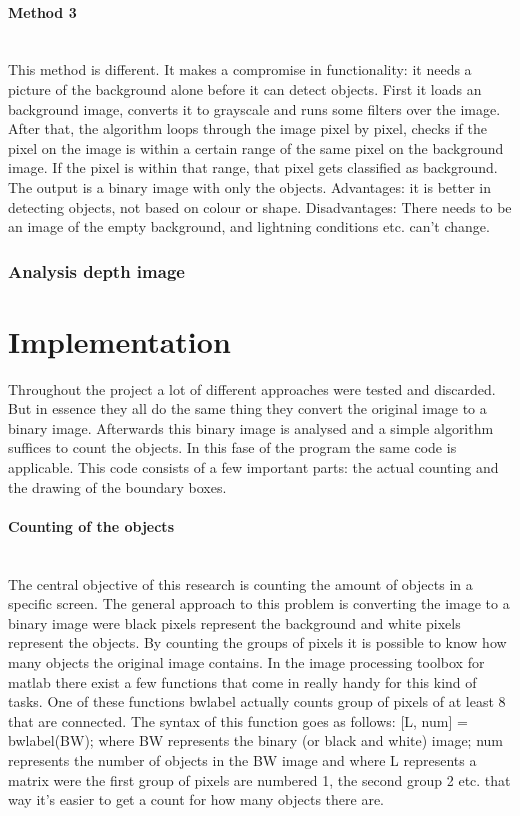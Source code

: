 \documentclass[11pt]{article}
\begin{document}
\paragraph{Method 3}\mbox{}\\
This method is different. It makes a compromise in functionality: it needs a picture of the background alone before it can detect objects. First it loads an background image, converts it to grayscale and runs some filters over the image. After that, the algorithm loops through the image pixel by pixel, checks if the pixel on the image is within a certain range of the same pixel on the background image. If the pixel is within that range, that pixel gets classified as background. The output is a binary image with only the objects.  
Advantages: it is better in detecting objects, not based on colour or shape.
Disadvantages: There needs to be an image of the empty background, and lightning conditions etc. can’t change.


\subsubsection{Analysis depth image}

\section{Implementation}
Throughout the project a lot of different approaches were tested and discarded. But in essence they all do the same thing they convert the original image to a binary image. Afterwards this binary image is analysed and a simple algorithm suffices to count the objects. In this fase of the program the same code is applicable. This code consists of a few important parts: the actual counting and the drawing of the boundary boxes. 
\paragraph{Counting of the objects}\mbox{}\\
The central objective of this research is counting the amount of objects in a specific screen. The general approach to this problem is converting the image to a binary image were black pixels represent the background and white pixels represent the objects. By counting the groups of pixels it is possible to know how many objects the original image contains. In the image processing toolbox for matlab there exist a few functions that come in really handy for this kind of tasks. One of these functions bwlabel actually counts group of pixels of at least 8 that are connected. The syntax of this function goes as follows: [L, num] = bwlabel(BW); where BW represents the binary (or black and white) image; num represents the number of objects in the BW image and where L represents a matrix were the first group of pixels are numbered 1, the second group 2 etc. that way it's easier to get a count for how many objects there are.
\end{document}
